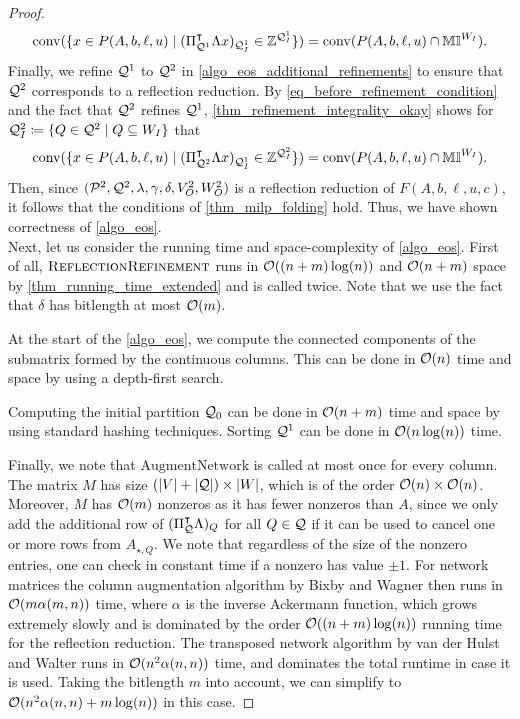 \documentclass[pdflatex,sn-mathphys-num]{sn-jnl}%
\theoremstyle{thmstyleone}%
\theoremstyle{thmstylethree}%
\theoremstyle{thmstyletwo}%
\newcommand{\conv}{\mathrm{conv}}
\begin{document}
\begin{proof}
\begin{equation}
    \label{eq_before_refinement_condition}
    \conv(\{x\in P(A,b,\ell,u) \mid (\transpose{\Pi_{\MQ^1}} \Lambda x)_{\MQ^1_I} \in \Z^{\MQ^1_I}\}) = \conv(P(A,b,\ell,u)\cap \M^{W_I}).
    \end{equation}
    Finally, we refine $\mathcal{Q}^1$ to $\mathcal{Q}^2$ in \ref{algo_eos_additional_refinements} to ensure that $\mathcal{Q}^2$ corresponds to a reflection reduction.
    By \eqref{eq_before_refinement_condition} and the fact that $\mathcal{Q}^2$ refines $\mathcal{Q}^1$,  \cref{thm_refinement_integrality_okay} shows for $\MQ^2_I \coloneqq \{Q \in \MQ^2 \mid Q\subseteq W_I \}$ that 
    \begin{equation*}
        \conv(\{x\in P(A,b,\ell,u) \mid (\transpose{\Pi_{\MQ^2}} \Lambda x)_{\MQ^1_I} \in \Z^{\MQ^2_I}\}) = \conv(P(A,b,\ell,u)\cap \M^{W_I}).
    \end{equation*}
    Then, since $(\mathcal{P}^2,\mathcal{Q}^2, \lambda, \gamma, \delta, V^2_O, W^2_O)$ is a reflection reduction of $F(A,b,\ell,u,c)$, it follows that the conditions of \cref{thm_milp_folding} hold. Thus, we have shown correctness of \cref{algo_eos}.\\

    Next, let us consider the running time and space-complexity of \cref{algo_eos}. First of all, $\textsc{ReflectionRefinement}$ runs in $\orderO((n+m) \log(n))$ and $\orderO(n+m)$ space by \cref{thm_running_time_extended} and is called twice. Note that we use the fact that $\delta$ has bitlength at most $\orderO(m)$.
    
    At the start of the \cref{algo_eos}, we compute the connected components of the submatrix formed by the continuous columns. This can be done in $\orderO(n)$ time and space by using a depth-first search.
    
    Computing the initial partition $\mathcal{Q}_0$ can be done in $\orderO(n+m)$ time and space by using standard hashing techniques. Sorting $\mathcal{Q}^1$ can be done in $\orderO(n \log(n))$ time.
    
    Finally, we note that $\mathrm{AugmentNetwork}$ is called at most once for every column. The matrix $M$ has size $(|V| + |\mathcal{Q}|)  \times |W|$, which is of the order $\orderO(n) \times \orderO(n)$. Moreover, $M$ has $\orderO(m)$ nonzeros as it has fewer nonzeros than $A$, since we only add the additional row of $(\Pi_{\mathcal{Q}}^{\intercal} \Lambda)_Q$ for all $Q \in \mathcal{Q}$ if it can be used to cancel one or more rows from $A_{\star,Q}$. We note that regardless of the size of the nonzero entries, one can check in constant time if a nonzero has value $\pm 1$. 
    For network matrices the column augmentation algorithm by Bixby and Wagner then runs in $\orderO(m \alpha(m,n))$ time, where $\alpha$ is the inverse Ackermann function, which grows extremely slowly and is dominated by the order $\orderO((n+m) \log(n))$ running time for the reflection reduction. The transposed network algorithm by van der Hulst and Walter runs in $\orderO(n^2 \alpha(n,n))$ time, and dominates the total runtime in case it is used. Taking the bitlength $m$ into account, we can simplify to $\orderO(n^2 \alpha(n,n) + m\log(n))$ in this case.  
\end{proof}
\end{document}
